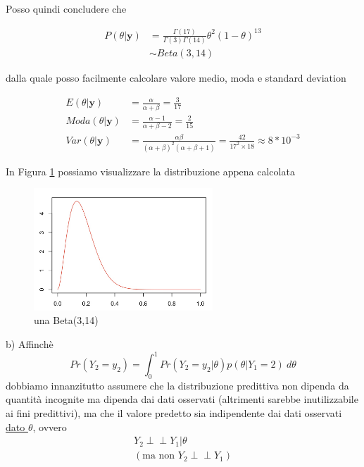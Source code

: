 Posso quindi concludere che 

\begin{align*}
    P(\theta|\textbf{y}) &= \frac{\Gamma(17)}{\Gamma(3)\Gamma(14)} \theta^2(1-\theta)^{13} \\
    &\sim Beta(3,14)
\end{align*}

dalla quale posso facilmente calcolare valore medio, moda e standard deviation

\begin{align*}
    E(\theta|\textbf{y}) &= \frac{\alpha}{\alpha + \beta} = \frac{3}{17}\\
    Moda(\theta|\textbf{y}) &= \frac{\alpha-1}{\alpha + \beta-2} = \frac{2}{15}\\
    Var(\theta|\textbf{y}) &= \frac{\alpha\beta}{(\alpha + \beta)^2(\alpha + \beta + 1)} = \frac{42}{17^2\times 18} \approx 8*10^{-3}
\end{align*}

In Figura \ref{fig:beta} possiamo visualizzare la distribuzione appena calcolata

\begin{figure}[!ht]
\centering
\includegraphics[width=0.6\textwidth]{img/esercizio3-07-Beta314}
\caption{una Beta(3,14)}
\label{fig:beta}
\end{figure}

b) Affinchè
\begin{equation} \label{eq:1}
    Pr(Y_2=y_2) = \int_0^1 Pr(Y_2=y_2|\theta)p(\theta|Y_1=2) \ d\theta
\end{equation}
dobbiamo innanzitutto assumere che la distribuzione predittiva non dipenda da quantità incognite ma dipenda dai dati osservati (altrimenti sarebbe inutilizzabile ai fini predittivi), ma che il valore predetto sia indipendente dai dati osservati \underline{dato $\theta$}, ovvero 
\begin{align*}
    Y_2 \perp\!\!\!\perp Y_1 | \theta \\
    (\text{ma non } Y_2 \perp\!\!\!\perp Y_1)
\end{align*}

